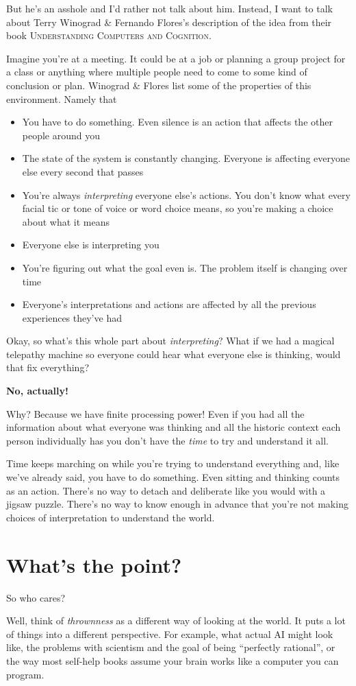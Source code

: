 \documentclass[statementpaper,oneside,article,14pt]{memoir}
\begin{document}
But he's an asshole and I'd rather not talk about him. Instead, I want to talk about Terry Winograd \& Fernando Flores's description of the idea from their book \textsc{Understanding Computers and Cognition}.

Imagine you're at a meeting. It could be at a job or planning a group project for a class or anything where multiple people need to come to some kind of conclusion or plan. Winograd \& Flores list some of the properties of this environment. Namely that
\begin{itemize}
    \item You have to do something. Even silence is an action that affects the other people around you
    \item The state of the system is constantly changing. Everyone is affecting everyone else every second that passes
    \item You're always \textit{interpreting} everyone else's actions. You don't know what every facial tic or tone of voice or word choice means, so you're making a choice about what it means
    \item Everyone else is interpreting you
    \item You're figuring out what the goal even is. The problem itself is changing over time
    \item Everyone's interpretations and actions are affected by all the previous experiences they've had
\end{itemize}

Okay, so what's this whole part about \textit{interpreting}? What if we had a magical telepathy machine so everyone could hear what everyone else is thinking, would that fix everything?

\textbf{No, actually!}

Why? Because we have finite processing power! Even if you had all the information about what everyone was thinking and all the historic context each person individually has you don't have the \textit{time} to try and understand it all. 

Time keeps marching on while you're trying to understand everything and, like we've already said, you have to do something. Even sitting and thinking counts as an action. There's no way to detach and deliberate like you would with a jigsaw puzzle. There's no way to know enough in advance that you're not making choices of interpretation to understand the world.
\newpage
\section{What's the point?}
So who cares? 

Well, think of \textit{thrownness} as a different way of looking at the world. It puts a lot of things into a different perspective. For example, what actual AI might look like, the problems with scientism and the goal of being ``perfectly rational'', or the way most self-help books assume your brain works like a computer you can program. 
\end{document}
